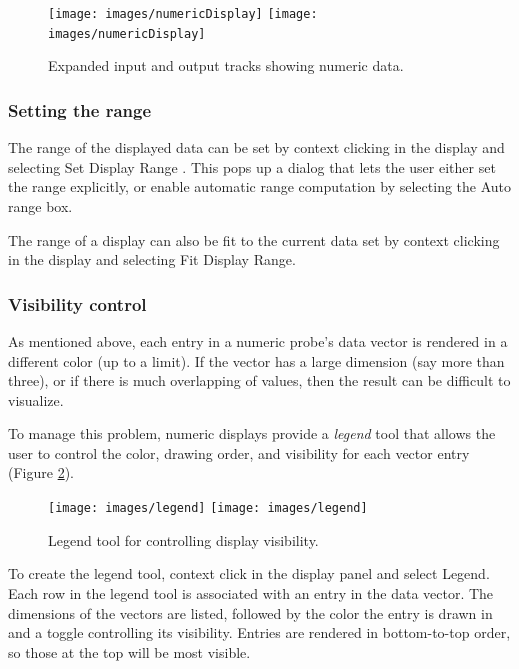 \documentclass{article}
\begin{document}
\begin{figure}
\begin{center}
\iflatexml
\texttt{[image: images/numericDisplay]}
\else
\texttt{[image: images/numericDisplay]}
\fi
\end{center}
\caption{Expanded input and output tracks showing numeric data.}%
\label{numericDisplayFig}
\end{figure}

\subsubsection{Setting the range}

The range of the displayed data can be set by context clicking in the
display and selecting {\sf Set Display Range} . This pops up a dialog that
lets the user either set the range explicitly, or enable automatic
range computation by selecting the {\sf Auto range} box.

The range of a display can also be fit to the current data
set by context clicking in the display and selecting {\sf Fit Display Range}.

\subsubsection{Visibility control}

As mentioned above, each entry in a numeric probe's data vector is
rendered in a different color (up to a limit).  If the vector has a
large dimension (say more than three), or if there is much overlapping
of values, then the result can be difficult to visualize.

To manage this problem, numeric displays provide a {\it legend} tool that
allows the user to control the color, drawing order, and visibility
for each vector entry (Figure \ref{legendFig}).

\begin{figure}
\begin{center}
\iflatexml
\texttt{[image: images/legend]}
\else
\texttt{[image: images/legend]}
\fi
\end{center}
\caption{Legend tool for controlling display visibility.}%
\label{legendFig}
\end{figure}

To create the legend tool, context click in the display panel and select
{\sf Legend}. Each row in the legend tool is associated with an entry in
the data vector. The dimensions of the vectors are listed, followed by 
the color the entry is drawn in and a toggle controlling its visibility.
Entries are rendered in bottom-to-top order, so those at the top will be
most visible.
\end{document}
